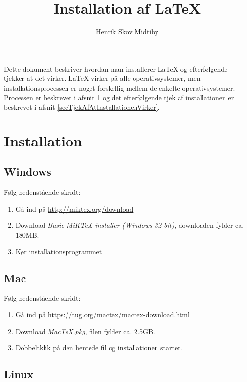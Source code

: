 \documentclass{article}
\title{Installation af \LaTeX}
\author{Henrik Skov Midtiby}
\begin{document}
\maketitle

Dette dokument beskriver hvordan man installerer \LaTeX{} og 
efterfølgende tjekker at det virker.
\LaTeX{} virker på alle operativsystemer, men installationsprocessen
er noget forskellig mellem de enkelte operativsystemer.
Processen er beskrevet i afsnit \ref{secInstallation} og 
det efterfølgende tjek af installationen er beskrevet i 
afsnit \ref{secTjekAfAtInstallationenVirker}.


\section{Installation}
\label{secInstallation}



\subsection{Windows}

Følg nedenstående skridt:
\begin{enumerate}
\item	Gå ind på \url{http://miktex.org/download}
\item	Download \emph{Basic MiKTeX installer (Windows 32-bit)}, downloaden fylder ca. 180MB.
\item	Kør installationsprogrammet
\end{enumerate}



\subsection{Mac}

Følg nedenstående skridt:
\begin{enumerate}
\item	Gå ind på \url{https://tug.org/mactex/mactex-download.html}
\item	Download \emph{MacTeX.pkg}, filen fylder ca. 2.5GB.
\item	Dobbeltklik på den hentede fil og installationen starter.
\end{enumerate}



\subsection{Linux}
\end{document}
